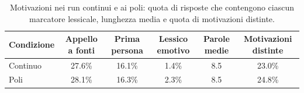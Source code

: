 \begin{table}[htbp]
\centering
\small
\begin{tabular}{lccccc}
\toprule
Condizione & Appello a fonti & Prima persona & Lessico emotivo & Parole medie & Motivazioni distinte \\
\midrule
Continuo & 27.6\% & 16.1\% & 1.4\% & 8.5 & 23.0\% \\
Poli & 28.1\% & 16.3\% & 2.3\% & 8.5 & 24.8\% \\
\bottomrule
\end{tabular}
\caption{Motivazioni nei run continui e ai poli: quota di risposte che contengono ciascun marcatore lessicale, lunghezza media e quota di motivazioni distinte.}
\label{tab:reasoning-overall}
\end{table}
